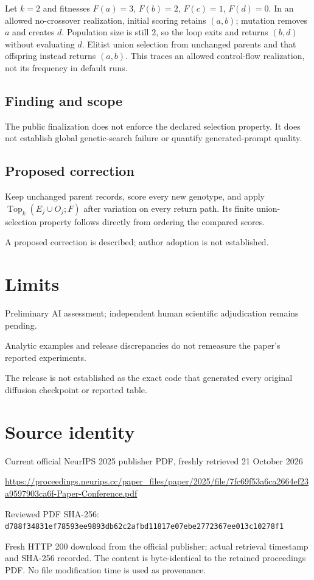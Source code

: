 \documentclass[11pt]{article}
\begin{document}
Let \(k=2\) and fitnesses \(F(a)=3\), \(F(b)=2\), \(F(c)=1\), \(F(d)=0\). In an allowed no-crossover realization, initial scoring retains \((a,b)\); mutation removes \(a\) and creates \(d\). Population size is still \(2\), so the loop exits and returns \((b,d)\) without evaluating \(d\). Elitist union selection from unchanged parents and that offspring instead returns \((a,b)\). This traces an allowed control-flow realization, not its frequency in default runs.

\subsection*{Finding and scope}

The public finalization does not enforce the declared selection property. It does not establish global genetic-search failure or quantify generated-prompt quality.

\subsection*{Proposed correction}

Keep unchanged parent records, score every new genotype, and apply \(\operatorname{Top}_k(E_j\cup O_j;F)\) after variation on every return path. Its finite union-selection property follows directly from ordering the compared scores.

A proposed correction is described; author adoption is not established.

\section*{Limits}

Preliminary AI assessment; independent human scientific adjudication remains pending.\par

Analytic examples and release discrepancies do not remeasure the paper’s reported experiments.\par

The release is not established as the exact code that generated every original diffusion checkpoint or reported table.\par

\section*{Source identity}

Current official NeurIPS 2025 publisher PDF, freshly retrieved 21 October 2026

\url{https://proceedings.neurips.cc/paper_files/paper/2025/file/7fc69f53a6ca2664ef23a9597903ca6f-Paper-Conference.pdf}

Reviewed PDF SHA-256: \nolinkurl{d788f34831ef78593ee9893db62c2afbd11817e07ebe2772367ee013c10278f1}

Fresh HTTP 200 download from the official publisher; actual retrieval timestamp and SHA-256 recorded. The content is byte-identical to the retained proceedings PDF. No file modification time is used as provenance.
\end{document}
